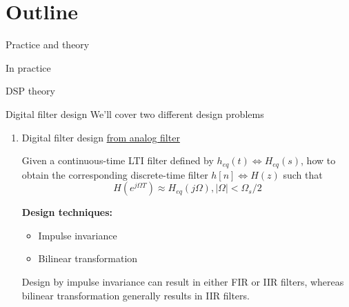 \documentclass[10pt]{beamer}
\begin{document}
%
\section{Outline}

\begin{frame}{Practice and theory}
\begin{block}{In practice}
	\vspace{-0.5cm}
	\begin{center}
		\resizebox{\linewidth}{!}{}
	\end{center}
\end{block}

\begin{block}{DSP theory}
	\vspace{-0.5cm}
	\begin{center}
		\def\Heff{1}
		\resizebox{\linewidth}{!}{}
	\end{center}
\end{block}

\end{frame}

\begin{frame}{Digital filter design}
	We'll cover two different design problems
	\begin{enumerate}
		\item Digital filter design \underline{from analog filter}
		
		Given a continuous-time LTI filter defined by $h_{eq}(t) \Longleftrightarrow H_{eq}(s)$, how to obtain the corresponding discrete-time filter $h[n] \Longleftrightarrow H(z)$ such that
		\begin{equation*}
			H(e^{j\Omega T}) \approx H_{eq}(j\Omega), |\Omega| < \Omega_s/2
		\end{equation*}
		
		\textbf{Design techniques:}
		\begin{itemize}
			\item Impulse invariance
			\item Bilinear transformation
		\end{itemize}
		Design by impulse invariance can result in either FIR or IIR filters, whereas bilinear transformation generally results in IIR filters. 
	\end{enumerate}
\end{frame}
\end{document}

